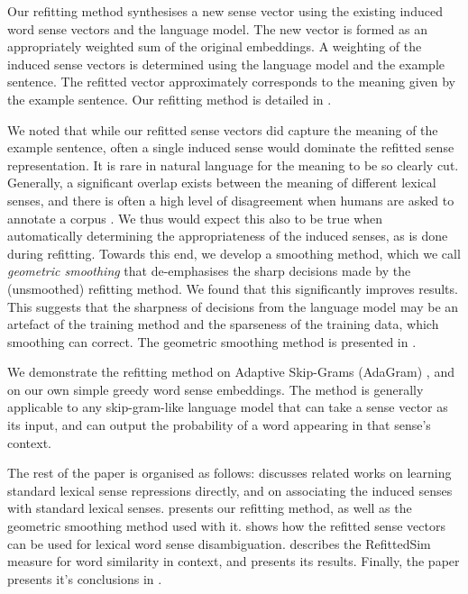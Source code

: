 \documentclass{sig-alternate}
\begin{document}
Our refitting method synthesises a new sense vector using the existing induced word sense vectors and the language model.
The new vector is formed as an appropriately weighted sum of the original embeddings. A weighting of the induced sense vectors is determined using the language model and the example sentence.
The refitted vector approximately corresponds to the meaning given by the example sentence. 
Our refitting method is detailed in .

We noted that while our refitted sense vectors did capture the meaning of the example sentence, often a single induced sense would dominate the refitted sense representation. It is rare in natural language for the meaning to be so clearly cut. Generally, a significant overlap exists between the meaning of different lexical senses, and there is often a high level of disagreement when humans are asked to annotate a corpus \parencite{veronis1998study}. We thus would expect this also to be true when automatically determining the appropriateness of the induced senses, as is done during refitting. Towards this end, we develop a smoothing method, which we call \emph{geometric smoothing} that de-emphasises the sharp decisions made by the (unsmoothed) refitting method. We found that this significantly improves results. This suggests that the sharpness of decisions from the language model may be an artefact of the training method and the sparseness of the training data, which smoothing can correct. The geometric smoothing method is presented in .


We demonstrate the refitting method on Adaptive Skip-Grams (AdaGram) \parencite{AdaGrams}, and on our own simple greedy word sense embeddings. The method is generally applicable to any skip-gram-like language model that can take a sense vector as its input, and can output the probability of a word appearing in that sense's context.


The rest of the paper is organised as follows:  discusses related works on learning standard lexical sense repressions directly, and on associating the induced senses with standard lexical senses.  presents our refitting method, as well as the geometric smoothing method used with it.  shows how the refitted sense vectors can be used for lexical word sense disambiguation.  describes the RefittedSim measure for word similarity in context, and presents its results. Finally, the paper presents it's conclusions in .
\end{document}
